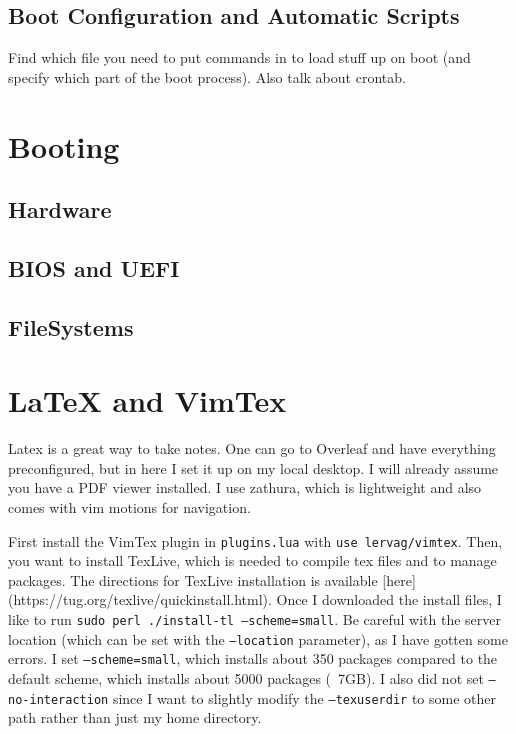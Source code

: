\documentclass{article}
\begin{document}
  \subsection{Boot Configuration and Automatic Scripts}

    Find which file you need to put commands in to load stuff up on boot (and specify which part of the boot process). Also talk about crontab. 

\section{Booting}

  \subsection{Hardware}


  \subsection{BIOS and UEFI}


  \subsection{FileSystems}


\section{LaTeX and VimTex} 

Latex is a great way to take notes. One can go to Overleaf and have everything preconfigured, but in here I set it up on my local desktop. I will already assume you have a PDF viewer installed. I use zathura, which is lightweight and also comes with vim motions for navigation. 

First install the VimTex plugin in \texttt{plugins.lua} with \texttt{use lervag/vimtex}. Then, you want to install TexLive, which is needed to compile tex files and to manage packages. The directions for TexLive installation is available [here](https://tug.org/texlive/quickinstall.html). Once I downloaded the install files, I like to run \texttt{sudo perl ./install-tl --scheme=small}. Be careful with the server location (which can be set with the \texttt{--location} parameter), as I have gotten some errors. I set \texttt{--scheme=small}, which installs about 350 packages compared to the default scheme, which installs about 5000 packages (~7GB). I also did not set \texttt{--no-interaction} since I want to slightly modify the \texttt{--texuserdir} to some other path rather than just my home directory. 
\end{document}
